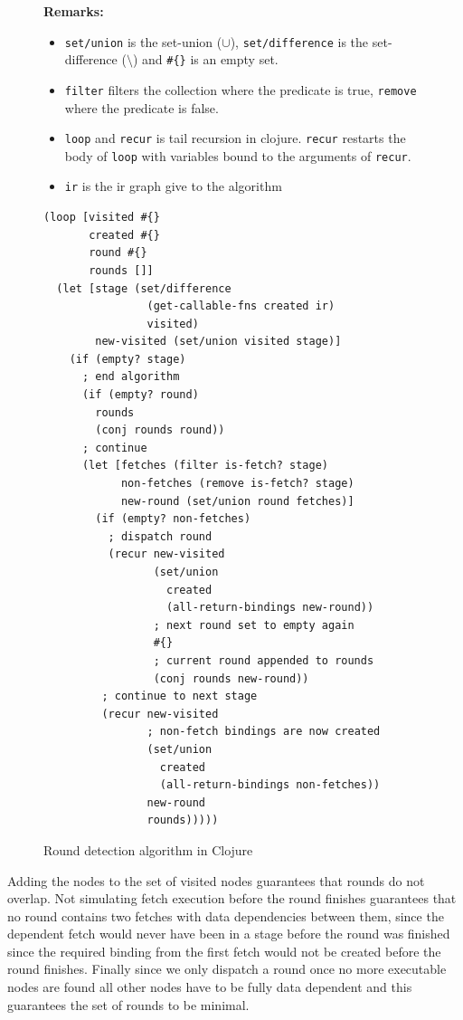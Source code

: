 \begin{figure}
\textbf{Remarks:}
\begin{itemize}
  \item \texttt{set/union} is the set-union ($\cup$), \texttt{set/difference} is the set-difference ($\setminus$) and \texttt{\#\{\}} is an empty set.
  \item \texttt{filter} filters the collection where the predicate is true, \texttt{remove} where the predicate is false.
  \item \texttt{loop} and \texttt{recur} is tail recursion in clojure.
    \texttt{recur} restarts the body of \texttt{loop} with variables bound to the arguments of \texttt{recur}.
  \item \texttt{ir} is the ir graph give to the algorithm
\end{itemize}
\begin{verbatim}
(loop [visited #{}
       created #{}
       round #{}
       rounds []]
  (let [stage (set/difference
                (get-callable-fns created ir)
                visited)
        new-visited (set/union visited stage)]
    (if (empty? stage)
      ; end algorithm
      (if (empty? round)
        rounds
        (conj rounds round))
      ; continue
      (let [fetches (filter is-fetch? stage)
            non-fetches (remove is-fetch? stage)
            new-round (set/union round fetches)]
        (if (empty? non-fetches)
          ; dispatch round
          (recur new-visited
                 (set/union
                   created
                   (all-return-bindings new-round))
                 ; next round set to empty again
                 #{}
                 ; current round appended to rounds
                 (conj rounds new-round))
         ; continue to next stage
         (recur new-visited
                ; non-fetch bindings are now created
                (set/union
                  created
                  (all-return-bindings non-fetches))
                new-round
                rounds)))))
\end{verbatim}
\caption{Round detection algorithm in Clojure}
\label{fig:round-detection}
\end{figure}

Adding the \fetch{} nodes to the set of visited nodes guarantees that rounds do not overlap.
Not simulating fetch execution before the round finishes guarantees that no round contains two fetches with data dependencies between them, since the dependent fetch would never have been in a stage before the round was finished since the required binding from the first fetch would not be created before the round finishes.
Finally since we only dispatch a round once no more executable nodes are found all other nodes have to be fully data dependent and this guarantees the set of rounds to be minimal.

